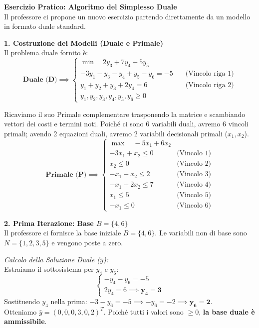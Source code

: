 \documentclass[12pt, a4paper]{article}
\begin{document}
	\vspace{0.6cm}
	\textbf{Esercizio Pratico: Algoritmo del Simplesso Duale}\\
	Il professore ci propone un nuovo esercizio partendo direttamente da un modello in formato duale standard. 
	
	\textbf{1. Costruzione dei Modelli (Duale e Primale)}\\
	Il problema duale fornito è:
	\[
	\textbf{Duale (D)} \implies
	\begin{cases}
		\min \quad 2y_3 + 7y_4 + 5y_5 \\[6pt]
		-3y_1 - y_3 - y_4 + y_5 - y_6 = -5 \quad &\text{(Vincolo riga 1)} \\
		y_1 + y_2 + y_3 + 2y_4 = 6 \quad &\text{(Vincolo riga 2)} \\[6pt]
		y_1, y_2, y_3, y_4, y_5, y_6 \geq 0
	\end{cases}
	\]
	
	Ricaviamo il suo Primale complementare trasponendo la matrice e scambiando vettori dei costi e termini noti. Poiché ci sono 6 variabili duali, avremo 6 vincoli primali; avendo 2 equazioni duali, avremo 2 variabili decisionali primali ($x_1, x_2$).
	\[
	\textbf{Primale (P)} \implies
	\begin{cases}
		\max \quad -5x_1 + 6x_2 \\[6pt]
		-3x_1 + x_2 \leq 0 \quad &\text{(Vincolo 1)} \\
		x_2 \leq 0 \quad &\text{(Vincolo 2)} \\
		-x_1 + x_2 \leq 2 \quad &\text{(Vincolo 3)} \\
		-x_1 + 2x_2 \leq 7 \quad &\text{(Vincolo 4)} \\
		x_1 \leq 5 \quad &\text{(Vincolo 5)} \\
		-x_1 \leq 0 \quad &\text{(Vincolo 6)}
	\end{cases}
	\]
	
	\vspace{0.4cm}
	\textbf{2. Prima Iterazione: Base $B = \{4, 6\}$}\\
	Il professore ci fornisce la base iniziale $B = \{4, 6\}$. Le variabili non di base sono $N = \{1, 2, 3, 5\}$ e vengono poste a zero.
	
	\textit{Calcolo della Soluzione Duale ($\bar{y}$):}\\
	Estraiamo il sottosistema per $y_4$ e $y_6$:
	\[
	\begin{cases}
		-y_4 - y_6 = -5 \\
		2y_4 = 6 \implies \mathbf{y_4 = 3}
	\end{cases}
	\]
	Sostituendo $y_4$ nella prima: $-3 - y_6 = -5 \implies -y_6 = -2 \implies \mathbf{y_6 = 2}$.\\
	Otteniamo $\bar{y} = (0, 0, 0, 3, 0, 2)^T$. Poiché tutti i valori sono $\geq 0$, \textbf{la base duale è ammissibile}.
	
\end{document}
